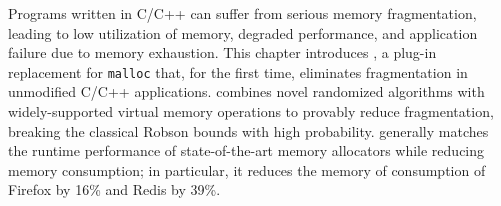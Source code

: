 
Programs written in C/C++ can suffer from serious memory
fragmentation, leading to low utilization of memory, degraded
performance, and application failure due to memory exhaustion. This
chapter introduces \Mesh, a plug-in replacement for \texttt{malloc}
that, for the first time, eliminates fragmentation in unmodified
C/C++ applications. \Mesh combines novel randomized algorithms with
widely-supported virtual memory operations to provably reduce
fragmentation, breaking the classical Robson bounds with high
probability. \Mesh generally matches the runtime performance of
state-of-the-art memory allocators while reducing memory consumption;
in particular, it reduces the memory of consumption of Firefox by 16\%
and Redis by 39\%.

